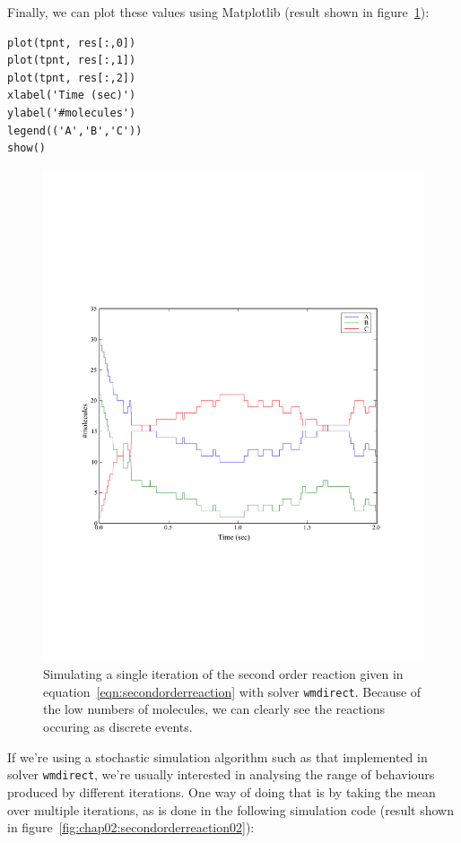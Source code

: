 \documentclass[a4paper,12pt]{book}
\begin{document}
Finally, we can plot these values using Matplotlib (result shown in figure~\ref{fig:chap02:secondorderreaction01}):
\begin{verbatim}
plot(tpnt, res[:,0])
plot(tpnt, res[:,1])
plot(tpnt, res[:,2])
xlabel('Time (sec)')
ylabel('#molecules')
legend(('A','B','C'))
show()
\end{verbatim}
\begin{figure}
\centering
\includegraphics[width=13cm]{chap02_secondorderreaction01.pdf}
\caption{Simulating a single iteration of the second order reaction given in equation~\ref{eqn:secondorderreaction} with solver \texttt{wmdirect}. Because of the low numbers of molecules, we can clearly see the reactions occuring as discrete events.}
\label{fig:chap02:secondorderreaction01}
\end{figure}

If we're using a stochastic simulation algorithm such as that implemented in solver \texttt{wmdirect}, we're usually interested in analysing the range of behaviours produced by different iterations. One way of doing that is by taking the mean over multiple iterations, as is done in the following simulation code (result shown in figure~\ref{fig:chap02:secondorderreaction02}):
\end{document}
